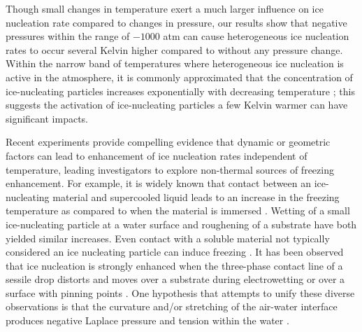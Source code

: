 \documentclass[journal abbreviation, manuscript]{copernicus}
\begin{document}
Though small changes in temperature exert a much larger influence on ice nucleation rate compared to changes in pressure, our results show that negative pressures within the range of $-1000$ atm can cause heterogeneous ice nucleation rates to occur several Kelvin higher compared to without any pressure change. Within the narrow band of temperatures where heterogeneous ice nucleation is active in the atmosphere, it is commonly approximated that the concentration of ice-nucleating particles increases exponentially with decreasing temperature \citep[Sec. 9.2]{pruppacher1997}; this suggests the activation of ice-nucleating particles a few Kelvin warmer can have significant impacts.

Recent experiments provide compelling evidence that dynamic or geometric factors can lead to enhancement of ice nucleation rates independent of temperature, leading investigators to explore non-thermal sources of freezing enhancement. For example, it is widely known that contact between an ice-nucleating material and supercooled liquid leads to an increase in the freezing temperature as compared to when the material is immersed \citep{pitter1973wind,levin1983contact,diehl2002ice}. Wetting of a small ice-nucleating particle at a water surface \citep{shaw2005} and roughening of a substrate \citep{gurganus2014nucleation} have both yielded similar increases. Even contact with a soluble material not typically considered an ice nucleating particle can induce freezing \citep{niehaus2015}. It has been observed that ice nucleation is strongly enhanced when the three-phase contact line of a sessile drop distorts and moves over a substrate during electrowetting \citep{yang2015} or over a surface with pinning points \citep{yang2018}. One hypothesis that attempts to unify these diverse observations is that the curvature and/or stretching of the air-water interface produces negative Laplace pressure and tension within the water \citep{marcolli2017,yang2020}.

\end{document}
